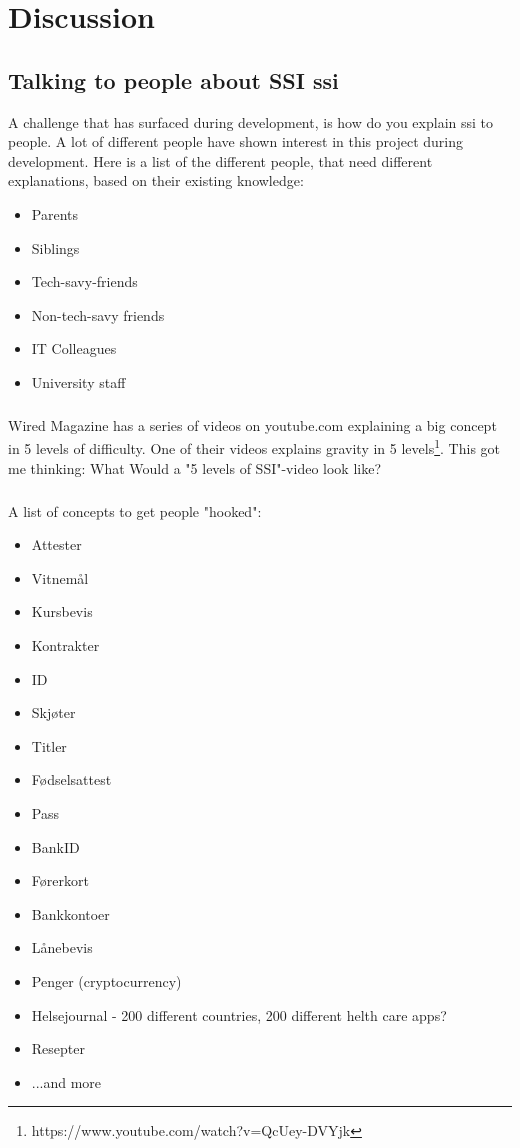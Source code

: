 \chapter{Discussion}

\section{Talking to people about SSI \acrfull{ssi}}

A challenge that has surfaced during development, is how do you explain \acrshort{ssi} to people. A lot of different people have shown interest in this project during development. Here is a list of the different people, that need different explanations, based on their existing knowledge:

\begin{itemize}
    \item Parents
    \item Siblings
    \item Tech-savy-friends
    \item Non-tech-savy friends
    \item IT Colleagues
    \item University staff
\end{itemize}

\paragraph{}
Wired Magazine has a series of videos on youtube.com explaining a big concept in 5 levels of difficulty. One of their videos explains gravity in 5 levels\footnote{https://www.youtube.com/watch?v=QcUey-DVYjk}. This got me thinking: What Would a "5 levels of SSI"-video look like?

\paragraph{}
A list of concepts to get people "hooked":
\begin{itemize}
    \item Attester
    \item Vitnemål
    \item Kursbevis
    \item Kontrakter
    \item ID
    \item Skjøter
    \item Titler
    \item Fødselsattest
    \item Pass
    \item BankID
    \item Førerkort
    \item Bankkontoer
    \item Lånebevis
    \item Penger (cryptocurrency)
    \item Helsejournal - 200 different countries, 200 different helth care apps?
    \item Resepter
    \item ...and more
\end{itemize}

